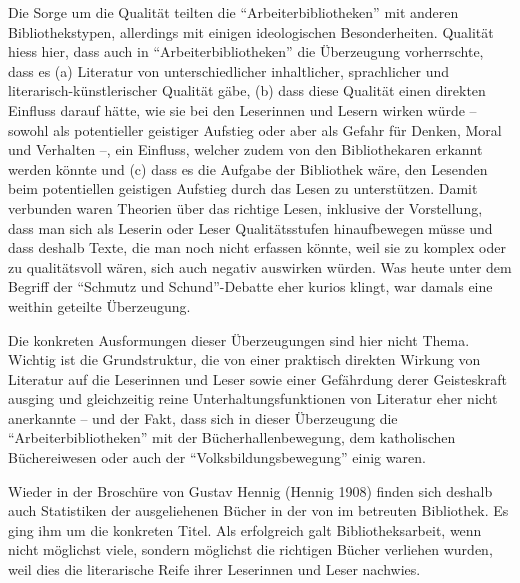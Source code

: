 \documentclass[a4paper,
fontsize=11pt,
oneside,
numbers=noperiodatend,
parskip=half-,
bibliography=totoc,
final
]{scrartcl}
\begin{document}
Die Sorge um die Qualität teilten die \enquote{Arbeiterbibliotheken} mit
anderen Bibliothekstypen, allerdings mit einigen ideologischen
Besonderheiten. Qualität hiess hier, dass auch in
\enquote{Arbeiterbibliotheken} die Überzeugung vorherrschte, dass es (a)
Literatur von unterschiedlicher inhaltlicher, sprachlicher und
literarisch-künstlerischer Qualität gäbe, (b) dass diese Qualität einen
direkten Einfluss darauf hätte, wie sie bei den Leserinnen und Lesern
wirken würde -- sowohl als potentieller geistiger Aufstieg oder aber als
Gefahr für Denken, Moral und Verhalten --, ein Einfluss, welcher zudem
von den Bibliothekaren erkannt werden könnte und (c) dass es die Aufgabe
der Bibliothek wäre, den Lesenden beim potentiellen geistigen Aufstieg
durch das Lesen zu unterstützen. Damit verbunden waren Theorien über das
richtige Lesen, inklusive der Vorstellung, dass man sich als Leserin
oder Leser Qualitätsstufen hinaufbewegen müsse und dass deshalb Texte,
die man noch nicht erfassen könnte, weil sie zu komplex oder zu
qualitätsvoll wären, sich auch negativ auswirken würden. Was heute unter
dem Begriff der \enquote{Schmutz und Schund}-Debatte eher kurios klingt,
war damals eine weithin geteilte Überzeugung.

Die konkreten Ausformungen dieser Überzeugungen sind hier nicht Thema.
Wichtig ist die Grundstruktur, die von einer praktisch direkten Wirkung
von Literatur auf die Leserinnen und Leser sowie einer Gefährdung derer
Geisteskraft ausging und gleichzeitig reine Unterhaltungsfunktionen von
Literatur eher nicht anerkannte -- und der Fakt, dass sich in dieser
Überzeugung die \enquote{Arbeiterbibliotheken} mit der
Bücherhallenbewegung, dem katholischen Büchereiwesen oder auch der
\enquote{Volksbildungsbewegung} einig waren.

Wieder in der Broschüre von Gustav Hennig (Hennig 1908) finden sich
deshalb auch Statistiken der ausgeliehenen Bücher in der von im
betreuten Bibliothek. Es ging ihm um die konkreten Titel. Als
erfolgreich galt Bibliotheksarbeit, wenn nicht möglichst viele, sondern
möglichst die richtigen Bücher verliehen wurden, weil dies die
literarische Reife ihrer Leserinnen und Leser nachwies.
\end{document}
